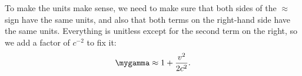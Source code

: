 To make the units make sense, we need to make sure that both sides of the $\approx$ sign have
the same units, and also that both terms on the right-hand side have the same units. Everything
is unitless except for the second term on the right, so we add a factor of $c^{-2}$ to fix it:
\begin{equation*}
  \mygamma\approx1+\frac{v^2}{2c^2}.
\end{equation*}
